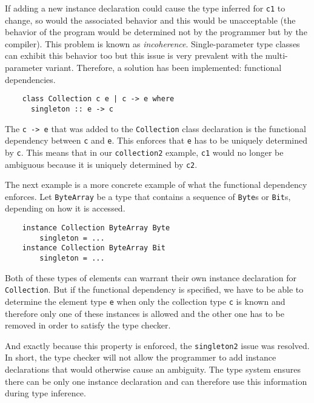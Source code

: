 If adding a new instance declaration could cause the type inferred for
\texttt{c1} to change, so would the associated behavior and this would be
unacceptable (the behavior of the program would be determined not by the programmer but by the compiler). This problem is known as {\em incoherence}.
Single-parameter type classes can exhibit this behavior
too but this issue is very prevalent with the
multi-parameter variant. Therefore, a solution has been implemented: functional
dependencies.
\begin{verbatim}
    class Collection c e | c -> e where
      singleton :: e -> c
\end{verbatim}
The \texttt{c -> e} that was added to the \texttt{Collection} class
declaration is the functional dependency between \texttt{c} and \texttt{e}. This
enforces that \texttt{e} has to be uniquely determined by \texttt{c}.
This means that in our \texttt{collection2} example, \texttt{c1} would no longer
be ambiguous because it is uniquely determined by \texttt{c2}.

The next example is a more concrete example of what the functional dependency
enforces. Let \texttt{ByteArray} be a type that contains a sequence of
\texttt{Byte}s or \texttt{Bit}s, depending on how it is accessed.
\begin{verbatim}
    instance Collection ByteArray Byte
        singleton = ...
    instance Collection ByteArray Bit
        singleton = ...
\end{verbatim}
Both of these types of elements can warrant their own instance declaration for
\texttt{Collection}. But if the functional dependency is specified, we have to
be able to determine the element type \texttt{e} when only the collection
type \texttt{c} is known and therefore only one of these instances is allowed
and the other one has to be removed in order to satisfy the type checker.

And exactly because this property is enforced, the \texttt{singleton2} issue was
resolved. In short, the type checker will not allow the programmer to add instance
declarations that would otherwise cause an ambiguity. The type system ensures
there can be only one instance declaration and can therefore use this
information during type inference.

